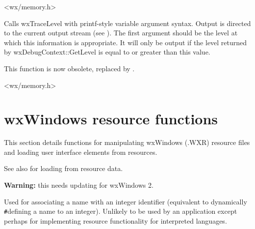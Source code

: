 
<wx/memory.h>

\label{tracelevel}


Calls wxTraceLevel with printf-style variable argument syntax. Output
is directed to the current output stream (see ).
The first argument should be the level at which this information is appropriate.
It will only be output if the level returned by wxDebugContext::GetLevel is equal to or greater than
this value.

This function is now obsolete, replaced by .


<wx/memory.h>

\section{wxWindows resource functions}\label{resourcefuncs}


This section details functions for manipulating wxWindows (.WXR) resource
files and loading user interface elements from resources.



See also  for
loading from resource data.

{\bf Warning:} this needs updating for wxWindows 2.

\label{wxresourceaddidentifier}


Used for associating a name with an integer identifier (equivalent to dynamically\rtfsp
\verb$#$defining a name to an integer). Unlikely to be used by an application except
perhaps for implementing resource functionality for interpreted languages.

